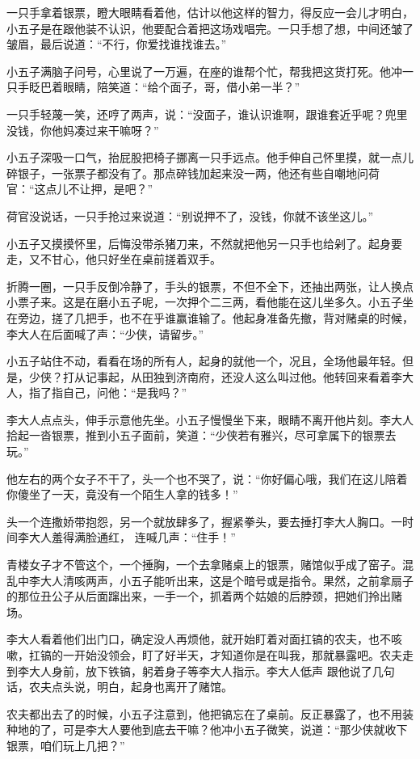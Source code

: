 一只手拿着银票，瞪大眼睛看着他，估计以他这样的智力，得反应一会儿才明白，小五子是在跟他装不认识，他要配合着把这场戏唱完。一只手想了想，中间还皱了皱眉，最后说道：“不行，你爱找谁找谁去。”

小五子满脑子问号，心里说了一万遍，在座的谁帮个忙，帮我把这货打死。他冲一只手眨巴着眼睛，陪笑道：“给个面子，哥，借小弟一半？”

一只手轻蔑一笑，还哼了两声，说：“没面子，谁认识谁啊，跟谁套近乎呢？兜里没钱，你他妈凑过来干嘛呀？”

小五子深吸一口气，抬屁股把椅子挪离一只手远点。他手伸自己怀里摸，就一点儿碎银子，一张票子都没有了。那点碎钱加起来没一两，他还有些自嘲地问荷官：“这点儿不让押，是吧？”

荷官没说话，一只手抢过来说道：“别说押不了，没钱，你就不该坐这儿。”

小五子又摸摸怀里，后悔没带杀猪刀来，不然就把他另一只手也给剁了。起身要走，又不甘心，他只好坐在桌前搓着双手。

折腾一圈，一只手反倒冷静了，手头的银票，不但不全下，还抽出两张，让人换点小票子来。这是在磨小五子呢，一次押个二三两，看他能在这儿坐多久。小五子坐在旁边，搓了几把手，也不在乎谁赢谁输了。他起身准备先撤，背对赌桌的时候，李大人在后面喊了声：“少侠，请留步。”

小五子站住不动，看看在场的所有人，起身的就他一个，况且，全场他最年轻。但是，少侠？打从记事起，从田独到济南府，还没人这么叫过他。他转回来看着李大人，指了指自己，问他：“是我吗？”

李大人点点头，伸手示意他先坐。小五子慢慢坐下来，眼睛不离开他片刻。李大人拾起一沓银票，推到小五子面前，笑道：“少侠若有雅兴，尽可拿属下的银票去玩。”

他左右的两个女子不干了，头一个也不哭了，说：“你好偏心哦，我们在这儿陪着你傻坐了一天，竟没有一个陌生人拿的钱多！”

头一个连撒娇带抱怨，另一个就放肆多了，握紧拳头，要去捶打李大人胸口。一时间李大人羞得满脸通红，
连喊几声：“住手！”

青楼女子才不管这个，一个捶胸，一个去拿赌桌上的银票，赌馆似乎成了窑子。混乱中李大人清咳两声，小五子能听出来，这是个暗号或是指令。果然，之前拿扇子的那位丑公子从后面蹿出来，一手一个，抓着两个姑娘的后脖颈，把她们拎出赌场。

李大人看着他们出门口，确定没人再烦他，就开始盯着对面扛镐的农夫，也不咳嗽，扛镐的一开始没领会，盯了好半天，才知道你是在叫我，那就暴露吧。农夫走到李大人身前，放下铁镐，躬着身子等李大人指示。李大人低声
跟他说了几句话，农夫点头说，明白，起身也离开了赌馆。

农夫都出去了的时候，小五子注意到，他把镐忘在了桌前。反正暴露了，也不用装种地的了，可是李大人要他到底去干嘛？他冲小五子微笑，说道：“那少侠就收下银票，咱们玩上几把？”


